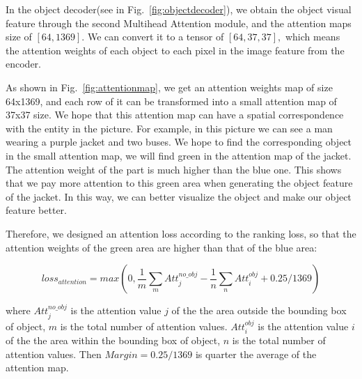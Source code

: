 In the object decoder(see in Fig.~\ref{fig:objectdecoder}), we obtain the object visual feature through the second Multihead Attention module, and the attention maps size of $ [64, 1369] $. We can convert it to a tensor of $ [64, 37, 37], $ which means the attention weights of each object to each pixel in the image feature from the encoder.



As shown in Fig.~\ref{fig:attentionmap}, we get an attention weights map of size 64x1369, and each row of it can be transformed into a small attention map of 37x37 size. We hope that this attention map can have a spatial correspondence with the entity in the picture. For example, in this picture we can see a man wearing a purple jacket and two buses. We hope to find the corresponding object in the small attention map, we will find green in the attention map of the jacket. The attention weight of the part is much higher than the blue one. This shows that we pay more attention to this green area when generating the object feature of the jacket. In this way, we can better visualize the object and make our object feature better.

Therefore, we designed an attention loss according to the ranking loss, so that the attention weights of the green area are higher than that of the blue area:

\begin{equation}
	loss_{attention}=max(0, \frac{1}{m}\sum_{m}Att_j^{no\_obj}-\frac{1}{n}\sum_{n}Att_i^{obj}+0.25
	/1369)
\end{equation}

where $Att_j^{no\_obj}$ is the attention value $  j  $ of the the area outside the bounding box  of  object, $ m $ is the total number of attention values. $ Att_i^{obj} $ is the attention value $  i  $ of the the area within the bounding box  of object, $ n $ is the total number of attention values. Then $ Margin=0.25/1369  $ is quarter the average of the attention map.

